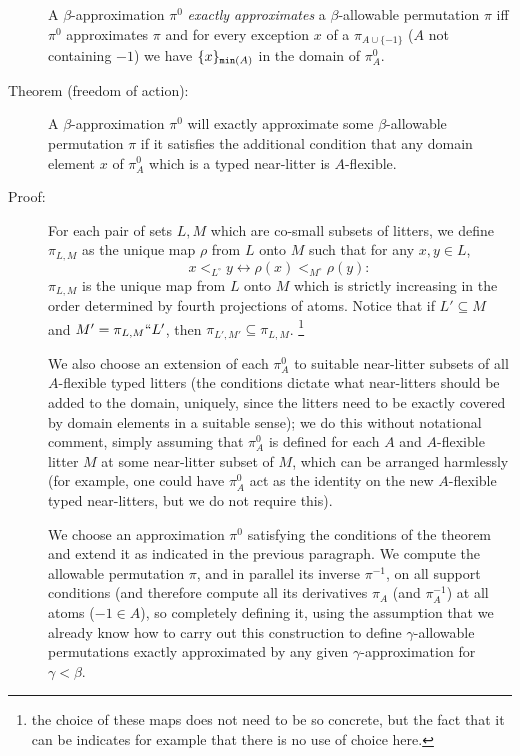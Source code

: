 \documentclass[112pt]{article}
\begin{document}
\begin{description}
A $\beta$-approximation $\pi^0$ {\em exactly approximates\/} a $\beta$-allowable permutation $\pi$ iff $\pi^0$ approximates $\pi$ and
for every exception $x$ of a $\pi_{A \cup \{-1\}}$ ($A$ not containing $-1$) we have $\{x\}_{{\tt min}(A)}$ in the domain of $\pi^0_A$.

\item[Theorem (freedom of action):]  A $\beta$-approximation $\pi^0$ will exactly approximate some $\beta$-allowable permutation $\pi$ if it satisfies the additional condition that any domain element $x$ of $\pi^0_A$ which is a typed near-litter is $A$-flexible.

\item[Proof:]   For each pair of sets $L,M$ which are co-small subsets of litters, we define $\pi_{L,M}$ as the unique map $\rho$ from $L$ onto $M$ such
that for any $x,y \in L$, $$x <_{L^{\circ}} y \leftrightarrow \rho(x) <_{M^\circ} \rho(y):$$  $\pi_{L,M}$ is the unique map from $L$ onto $M$ which is strictly increasing in the order determined by fourth projections of atoms.  Notice that if $L' \subseteq M$ and $M' = \pi_{L,M}``L'$, then $\pi_{L',M'} \subseteq \pi_{L,M}$.  \footnote{the choice of these maps does not need to be so concrete, but the fact that it can be indicates for example that there is no use of choice here.}

We also choose an extension of each  $\pi^0_A$ to suitable near-litter subsets of all $A$-flexible typed litters (the conditions dictate what near-litters should be added to the domain, uniquely, since the litters need to be exactly covered by domain elements in a suitable sense);  we do this without notational comment, simply assuming that $\pi^0_A$ is defined for each $A$ and $A$-flexible litter $M$ at some near-litter subset of $M$, which can be arranged harmlessly
(for example, one could have $\pi^0_A$ act as the identity on the new $A$-flexible typed near-litters, but we do not require this).

We choose an approximation $\pi^0$ satisfying the conditions of the theorem and extend it as indicated in the previous paragraph.  We compute the allowable permutation $\pi$, and in parallel its inverse $\pi^{-1}$, on
all support conditions (and therefore compute all its derivatives $\pi_A$ (and $\pi^{-1}_A$) at all atoms ($-1 \in A$), so completely defining it, using the assumption that we already know how to carry out this construction to
define $\gamma$-allowable permutations exactly approximated by any given $\gamma$-approximation for $\gamma<\beta$.


\end{description}
\end{document}
